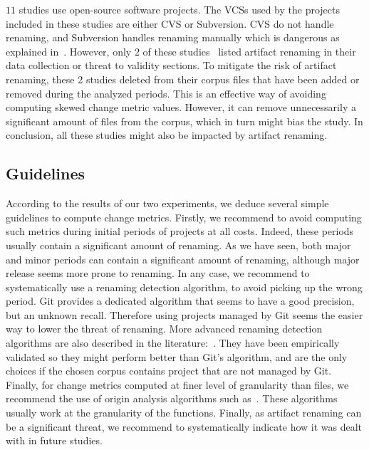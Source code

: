 $11$ studies use open-source software projects\cite{dambros_relationship_2009,bacchelli_are_2010,caglayan_merits_2009,dambros_evaluating_2012,dambros_evaluating_2012,dambros_extensive_2010,illes-seifert_exploring_2010,li_finding_2005,matsumoto_analysis_2010,moser_analysis_2008,moser_comparative_2008,schroter_if_2006}. The VCSs used by the projects included in these studies are either CVS or Subversion. CVS do not handle renaming, and Subversion handles renaming manually which is dangerous as explained in~\cite{lavoie_inferring_2012,steidl_incremental_2014}. However, only $2$ of these studies~\cite{moser_analysis_2008,moser_comparative_2008} listed artifact renaming in their data collection or threat to validity sections. To mitigate the risk of artifact renaming, these 2 studies deleted from their corpus files that have been added or removed during the analyzed periods. This is an effective way of avoiding computing skewed change metric values. However, it can remove unnecessarily a significant amount of files from the corpus, which in turn might bias the study. In conclusion, all these studies might also be impacted by artifact renaming.

\subsection{Guidelines}
\label{sec:guidelines}

According to the results of our two experiments, we deduce several simple guidelines to compute change metrics. Firstly, we recommend to avoid computing such metrics during initial periods of projects at all costs. Indeed, these periods usually contain a significant amount of renaming. As we have seen, both major and minor periods can contain a significant amount of renaming, although major release seems more prone to renaming. In any case, we recommend to systematically use a renaming detection algorithm, to avoid picking up the wrong period. Git provides a dedicated algorithm that seems to have a good precision, but an unknown recall. Therefore using projects managed by Git seems the easier way to lower the threat of renaming. More advanced renaming detection algorithms are also described in the literature:~\cite{antoniol_automatic_2004,lavoie_inferring_2012,steidl_incremental_2014}. They have been empirically validated so they might perform better than Git's algorithm, and are the only choices if the chosen corpus contains project that are not managed by Git. Finally, for change metrics computed at finer level of granularity than files, we recommend the use of origin analysis algorithms such as~\cite{wu_aura:_2010}. These algorithms usually work at the granularity of the functions. Finally, as artifact renaming can be a significant threat, we recommend to systematically indicate how it was dealt with in future studies.
